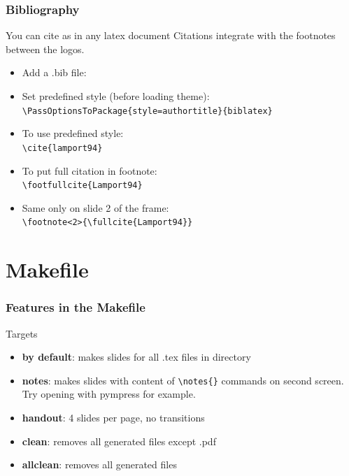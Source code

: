 \documentclass[c,12pt]{beamer}
\begin{document}
\begin{frame}[fragile]
	\frametitle{Bibliography}
	\begin{block}{You can cite as in any latex document}
		Citations integrate with the footnotes between the logos.
		\begin{itemize}
			\item Add a .bib file: \\ \verb||
			\item Set predefined style (before loading theme): \\ \verb|\PassOptionsToPackage{style=authortitle}{biblatex}|
			\item To use predefined style: \\ \verb|\cite{lamport94}|
			\item To put full citation in footnote: \\ \verb|\footfullcite{Lamport94}|
			\item Same only on slide 2 of the frame: \\ \verb|\footnote<2>{\fullcite{Lamport94}}|
		\end{itemize}
	\end{block}
\end{frame}

\section{Makefile}

\begin{frame}[fragile]
	\frametitle[Makefile ft.]{Features in the Makefile}
	\begin{block}{Targets}
		\begin{itemize}
			\item{\textbf{by default}:} makes slides for all .tex files in directory
			\item{\textbf{notes}:} makes slides with content of \verb|\notes{}| commands on second screen.\\ Try opening with pympress for example.
			\item{\textbf{handout}:} 4 slides per page, no transitions
			\item{\textbf{clean}:} removes all generated files except .pdf
			\item{\textbf{allclean}:} removes all generated files
		\end{itemize}
	\end{block}
\end{frame}
\end{document}
